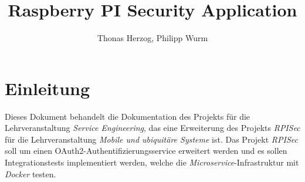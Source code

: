 \documentclass[]{article}
\title{Raspberry PI Security Application}
\author{Thonas Herzog, Philipp Wurm}
\begin{document}
\maketitle

\section{Einleitung}
Dieses Dokument behandelt die Dokumentation des Projekts für die Lehrveranstaltung \emph{Service Engineering}, das eine Erweiterung des Projekts \emph{RPISec} für die Lehrveranstaltung \emph{Mobile und ubiquitäre Systeme} ist. Das Projekt \emph{RPISec} soll um einen OAuth2-Authentifizierungsservice erweitert werden und es sollen Integrationstests implementiert werden, welche die \emph{Microservice}-Infrastruktur mit \emph{Docker} testen.
\end{document}

